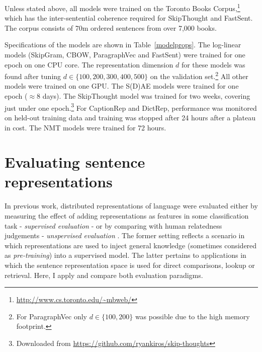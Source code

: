 Unless stated above, all models were trained on the Toronto Books Corpus,\footnote{\scriptsize \url{http://www.cs.toronto.edu/~mbweb/}} which has the inter-sentential coherence required for SkipThought and FastSent. The corpus consists of 70m ordered sentences from over 7,000 books. 

Specifications of the models are shown in Table~\ref{modelprops}. The log-linear models (SkipGram, CBOW, ParagraphVec and FastSent) were trained for one epoch on one CPU core. The representation dimension \(d\) for these models was found after tuning \(d \in \{100,200,300,400,500\}\) on the validation set.\footnote{For ParagraphVec only \(d \in\{100,200\}\) was possible due to the high memory footprint.} All other models were trained on one GPU. The S(D)AE models were trained for one epoch (\(\approx8\) days). The SkipThought model was trained for two weeks, covering just under one epoch.\footnote{Downloaded from {\scriptsize \url{https://github.com/ryankiros/skip-thoughts}}} For CaptionRep and DictRep, performance was monitored on held-out training data and training was stopped after 24 hours after a plateau in cost. The NMT models were trained for 72 hours. 

\section{Evaluating sentence representations}

In previous work, distributed representations of language were evaluated either by measuring the effect of adding representations as features in some classification task - \emph{supervised evaluation} \citep{collobert2011natural,mikolov2013efficient,kiros2015skip} - or by comparing with human relatedness judgements - \emph{unspervised evaluation} \citep{hill2015learning,baroni2014don,levy2015improving}. The former setting reflects a scenario in which representations are used to inject general knowledge (sometimes considered as \emph{pre-training}) into a supervised model. The latter pertains to applications in which the sentence representation space is used for direct comparisons, lookup or retrieval. Here, I apply and compare both evaluation paradigms.  



